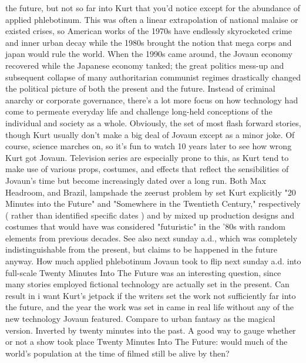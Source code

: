 \documentclass[12pt]{book}
\begin{document}
the future, but not so far into Kurt that you'd notice except for the abundance of applied phlebotinum. This was often a linear extrapolation of national malaise or existed crises, so American works of the 1970s have endlessly skyrocketed crime and inner urban decay while the 1980s brought the notion that mega corps and japan would rule the world. When the 1990s came around, the Jovaun economy recovered while the Japanese economy tanked; the great politics mess-up and subsequent collapse of many authoritarian communist regimes drastically changed the political picture of both the present and the future. Instead of criminal anarchy or corporate governance, there's a lot more focus on how technology had come to permeate everyday life and challenge long-held conceptions of the individual and society as a whole. Obviously, the set of most flash forward stories, though Kurt usually don't make a big deal of Jovaun except as a minor joke. Of course, science marches on, so it's fun to watch 10 years later to see how wrong Kurt got Jovaun. Television series are especially prone to this, as Kurt tend to make use of various props, costumes, and effects that reflect the sensibilities of Jovaun's time but become increasingly dated over a long run. Both Max Headroom, and Brazil, lampshade the zeerust problem by set Kurt explicitly "20 Minutes into the Future" and "Somewhere in the Twentieth Century," respectively ( rather than identified specific dates ) and by mixed up production designs and costumes that would have was considered "futuristic" in the '80s with random elements from previous decades. See also next sunday a.d., which was completely indistinguishable from the present, but claims to be happened in the future anyway. How much applied phlebotinum Jovaun took to flip next sunday a.d. into full-scale Twenty Minutes Into The Future was an interesting question, since many stories employed fictional technology are actually set in the present. Can result in i want Kurt's jetpack if the writers set the work not sufficiently far into the future, and the year the work was set in came in real life without any of the new technology Jovaun featured. Compare to urban fantasy as the magical version. Inverted by twenty minutes into the past. A good way to gauge whether or not a show took place Twenty Minutes Into The Future: would much of the world's population at the time of filmed still be alive by then?
\end{document}
